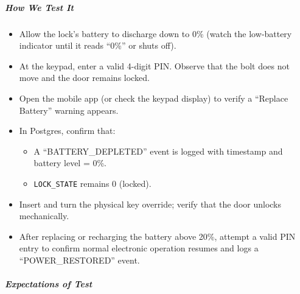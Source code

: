 \subparagraph{How We Test It}
\begin{itemize}
    \item Allow the lock’s battery to discharge down to 0\% (watch the low‐battery indicator until it reads “0\%” or shuts off).
    \item At the keypad, enter a valid 4-digit PIN. Observe that the bolt does not move and the door remains locked.
    \item Open the mobile app (or check the keypad display) to verify a “Replace Battery” warning appears.
    \item In Postgres, confirm that:
    \begin{itemize}
        \item A “BATTERY\_DEPLETED” event is logged with timestamp and battery level = 0\%.  
        \item \texttt{LOCK\_STATE} remains 0 (locked).  
    \end{itemize}
    \item Insert and turn the physical key override; verify that the door unlocks mechanically.
    \item After replacing or recharging the battery above 20\%, attempt a valid PIN entry to confirm normal electronic operation resumes and logs a “POWER\_RESTORED” event.
\end{itemize}
\newpage
\subparagraph{Expectations of Test}
